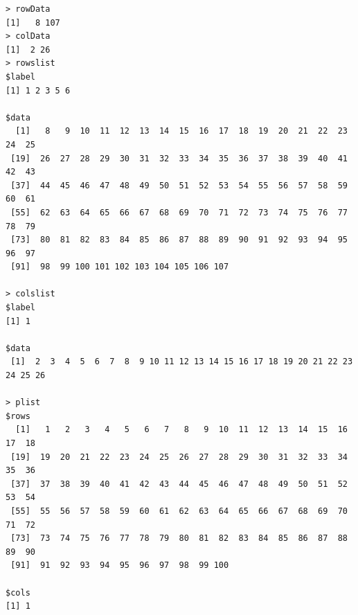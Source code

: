 \documentclass[a4paper]{article}
\begin{document}
\begin{verbatim}
> rowData 
[1]   8 107
> colData 
[1]  2 26
> rowslist 
$label
[1] 1 2 3 5 6

$data
  [1]   8   9  10  11  12  13  14  15  16  17  18  19  20  21  22  23  24  25
 [19]  26  27  28  29  30  31  32  33  34  35  36  37  38  39  40  41  42  43
 [37]  44  45  46  47  48  49  50  51  52  53  54  55  56  57  58  59  60  61
 [55]  62  63  64  65  66  67  68  69  70  71  72  73  74  75  76  77  78  79
 [73]  80  81  82  83  84  85  86  87  88  89  90  91  92  93  94  95  96  97
 [91]  98  99 100 101 102 103 104 105 106 107

> colslist 
$label
[1] 1

$data
 [1]  2  3  4  5  6  7  8  9 10 11 12 13 14 15 16 17 18 19 20 21 22 23 24 25 26

> plist 
$rows
  [1]   1   2   3   4   5   6   7   8   9  10  11  12  13  14  15  16  17  18
 [19]  19  20  21  22  23  24  25  26  27  28  29  30  31  32  33  34  35  36
 [37]  37  38  39  40  41  42  43  44  45  46  47  48  49  50  51  52  53  54
 [55]  55  56  57  58  59  60  61  62  63  64  65  66  67  68  69  70  71  72
 [73]  73  74  75  76  77  78  79  80  81  82  83  84  85  86  87  88  89  90
 [91]  91  92  93  94  95  96  97  98  99 100

$cols
[1] 1


\end{verbatim}
\end{document}
